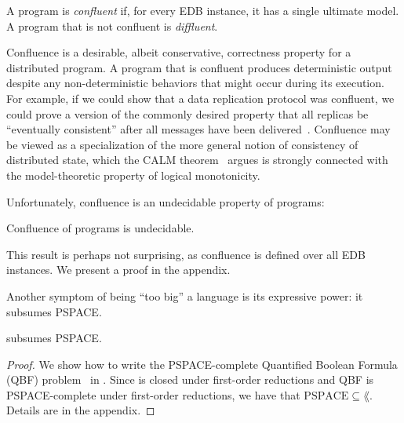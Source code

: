 \begin{definition}
  A \lang program is {\em confluent} if, for every EDB instance, it has a single ultimate model.  A program that is not confluent is {\em diffluent}.
\end{definition}


Confluence is a desirable, albeit conservative, correctness property for a
distributed program.  A program that is confluent produces deterministic output
despite any non-deterministic behaviors that might occur during its
execution. For example, if we could show that a data replication protocol was
confluent, we could prove a version of the commonly desired property that all
replicas be ``eventually consistent'' after all messages have been
delivered~\cite{bayou,doug-terry}.  Confluence may be viewed as a specialization of the
more general notion of consistency of distributed state, which the CALM
theorem~\cite{declarative-imperative} argues is strongly connected with the
model-theoretic property of logical monotonicity.

Unfortunately, confluence is an undecidable property of \lang programs:

\begin{lemma}
\label{lem:confluence-undecidable}
Confluence of \lang programs is undecidable.
\end{lemma}
This result is perhaps not surprising, as confluence is defined over all EDB instances.  We present a proof in the appendix.


Another symptom of \lang being ``too big'' a language is its expressive power: it subsumes PSPACE.  

\begin{lemma}
\label{lem:lang-pspace}
\lang %
subsumes PSPACE.
\end{lemma}

\begin{proof}

We show how to write the PSPACE-complete Quantified Boolean Formula (QBF) problem~\cite{garey-johnson} in \lang. Since \lang is closed under first-order reductions and QBF is PSPACE-complete under first-order reductions, we have that $\text{PSPACE} \subseteq \lang$.  Details are in the appendix.
\end{proof}

